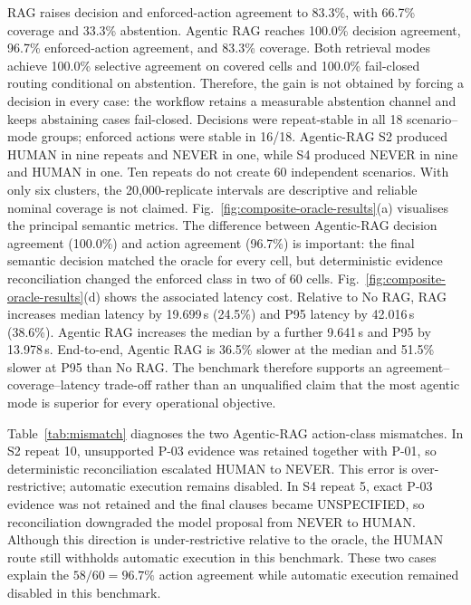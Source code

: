 \documentclass[journal]{IEEEtran}
\newif\ifshowrevisions
\newenvironment{revision}{\begingroup\ifshowrevisions\color{blue}\else\color{black}\fi}{\endgroup}
\begin{document}
\begin{revision}
RAG raises decision and enforced-action agreement to 83.3\%, with 66.7\%
coverage and 33.3\% abstention. Agentic RAG reaches 100.0\% decision agreement,
96.7\% enforced-action agreement, and 83.3\% coverage. Both retrieval modes
achieve 100.0\% selective agreement on covered cells and 100.0\% fail-closed
routing conditional on abstention. Therefore, the gain is not obtained by forcing a
decision in every case: the workflow retains a measurable abstention channel
and keeps abstaining cases fail-closed.
Decisions were repeat-stable in all 18 scenario--mode groups; enforced actions
were stable in 16/18. Agentic-RAG S2 produced HUMAN in nine repeats and NEVER
in one, while S4 produced NEVER in nine and HUMAN in one. Ten repeats do not
create 60 independent scenarios. With only six clusters, the 20{,}000-replicate
intervals are descriptive and reliable nominal coverage is not claimed.
Fig.~\ref{fig:composite-oracle-results}(a) visualises the principal semantic
metrics.
The difference between Agentic-RAG decision agreement (100.0\%) and action
agreement (96.7\%) is important: the final semantic decision matched the oracle
for every cell, but deterministic evidence reconciliation changed the enforced
class in two of 60 cells. Fig.~\ref{fig:composite-oracle-results}(d) shows the
associated latency cost. Relative to No RAG, RAG increases median latency by
19.699\,s (24.5\%) and P95 latency by 42.016\,s (38.6\%). Agentic RAG
increases the median by a further 9.641\,s and P95 by 13.978\,s. End-to-end,
Agentic RAG is 36.5\% slower at the median and 51.5\% slower at P95 than No
RAG. The benchmark therefore supports an agreement--coverage--latency trade-off
rather than an unqualified claim that the most agentic mode is superior for
every operational objective.

Table~\ref{tab:mismatch} diagnoses the two Agentic-RAG action-class
mismatches. In S2 repeat 10, unsupported P-03 evidence was retained together
with P-01, so deterministic reconciliation escalated HUMAN to NEVER. This
error is over-restrictive; automatic execution remains disabled. In S4 repeat 5, exact P-03 evidence was not retained and the
final clauses became UNSPECIFIED, so reconciliation downgraded the model
proposal from NEVER to HUMAN. Although this direction is under-restrictive
relative to the oracle, the HUMAN route still withholds automatic execution
in this benchmark. These two cases explain the $58/60 = 96.7\%$ action
agreement while automatic execution remained disabled in this benchmark.
\begin{table}[!t]
\centering

\end{table}
\end{revision}
\end{document}
